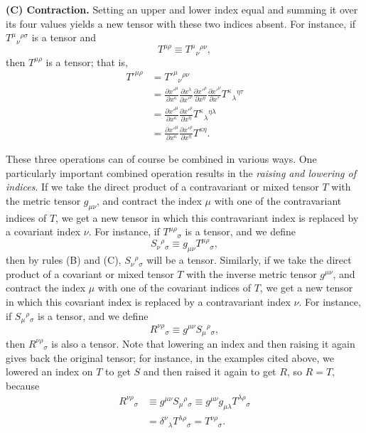 \medskip
\noindent\textbf{(C) Contraction.}
Setting an upper and lower index equal and summing it over its four values
yields a new tensor with these two indices absent. For instance, if
\(T^\mu{}_\nu{}^{\rho\sigma}\) is a tensor and
\[
  T^{\mu\rho}\equiv T^\mu{}_\nu{}^{\rho\nu},
\]
then \(T^{\mu\rho}\) is a tensor; that is,
\begin{align*}
  T'^{\mu\rho}
  &=T'^\mu{}_\nu{}^{\rho\nu}
  \\
  &=
  \frac{\partial x'^\mu}{\partial x^\kappa}
  \frac{\partial x^\lambda}{\partial x'^\nu}
  \frac{\partial x'^\rho}{\partial x^\eta}
  \frac{\partial x'^\nu}{\partial x^\tau}
  T^\kappa{}_\lambda{}^{\eta\tau}
  \\
  &=
  \frac{\partial x'^\mu}{\partial x^\kappa}
  \frac{\partial x'^\rho}{\partial x^\eta}
  T^\kappa{}_\lambda{}^{\eta\lambda}
  \\
  &=
  \frac{\partial x'^\mu}{\partial x^\kappa}
  \frac{\partial x'^\rho}{\partial x^\eta}T^{\kappa\eta}.
\end{align*}

These three operations can of course be combined in various ways. One
particularly important combined operation results in the \textit{raising and
lowering of indices}. If we take the direct product of a contravariant or
mixed tensor \(T\) with the metric tensor \(g_{\mu\nu}\), and contract the
index \(\mu\) with one of the contravariant indices of \(T\), we get a new
tensor in which this contravariant index is replaced by a covariant index
\(\nu\). For instance, if \(T^{\mu\rho}{}_\sigma\) is a tensor, and we define
\[
  S_\nu{}^\rho{}_\sigma\equiv g_{\mu\nu}T^{\mu\rho}{}_\sigma,
\]
then by rules (B) and (C), \(S_\nu{}^\rho{}_\sigma\) will be a tensor.
Similarly, if we take the direct product of a covariant or mixed tensor \(T\)
with the inverse metric tensor \(g^{\mu\nu}\), and contract the index \(\mu\)
with one of the covariant indices of \(T\), we get a new tensor in which this
covariant index is replaced by a contravariant index \(\nu\). For instance,
if \(S_\mu{}^\rho{}_\sigma\) is a tensor, and we define
\[
  R^{\nu\rho}{}_\sigma\equiv g^{\mu\nu}S_\mu{}^\rho{}_\sigma,
\]
then \(R^{\nu\rho}{}_\sigma\) is also a tensor. Note that lowering an index
and then raising it again gives back the original tensor; for instance, in
the examples cited above, we lowered an index on \(T\) to get \(S\) and then
raised it again to get \(R\), so \(R=T\), because
\begin{align*}
  R^{\nu\rho}{}_\sigma
  &\equiv g^{\mu\nu}S_\mu{}^\rho{}_\sigma
   \equiv g^{\mu\nu}g_{\mu\lambda}T^{\lambda\rho}{}_\sigma
  \\
  &=\delta^\nu{}_\lambda T^{\lambda\rho}{}_\sigma
   =T^{\nu\rho}{}_\sigma.
\end{align*}


